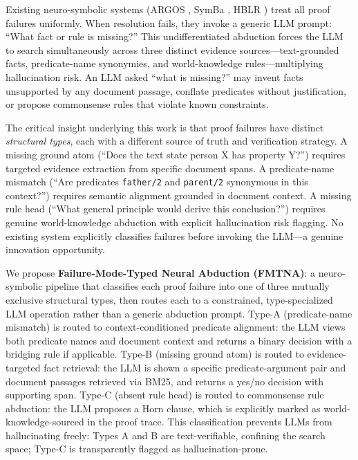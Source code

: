 \documentclass[11pt,letterpaper]{article}
\begin{document}
Existing neuro-symbolic systems (ARGOS \citep{Cotnareanu2026}, SymBa \citep{Lee2024}, HBLR \citep{Li2025}) treat all proof failures uniformly. When resolution fails, they invoke a generic LLM prompt: ``What fact or rule is missing?'' This undifferentiated abduction forces the LLM to search simultaneously across three distinct evidence sources---text-grounded facts, predicate-name synonymies, and world-knowledge rules---multiplying hallucination risk. An LLM asked ``what is missing?'' may invent facts unsupported by any document passage, conflate predicates without justification, or propose commonsense rules that violate known constraints.

The critical insight underlying this work is that proof failures have distinct \emph{structural types}, each with a different source of truth and verification strategy. A missing ground atom (``Does the text state person X has property Y?'') requires targeted evidence extraction from specific document spans. A predicate-name mismatch (``Are predicates \texttt{father/2} and \texttt{parent/2} synonymous in this context?'') requires semantic alignment grounded in document context. A missing rule head (``What general principle would derive this conclusion?'') requires genuine world-knowledge abduction with explicit hallucination risk flagging. No existing system explicitly classifies failures before invoking the LLM---a genuine innovation opportunity.

We propose \textbf{Failure-Mode-Typed Neural Abduction (FMTNA)}: a neuro-symbolic pipeline that classifies each proof failure into one of three mutually exclusive structural types, then routes each to a constrained, type-specialized LLM operation rather than a generic abduction prompt. Type-A (predicate-name mismatch) is routed to context-conditioned predicate alignment: the LLM views both predicate names and document context and returns a binary decision with a bridging rule if applicable. Type-B (missing ground atom) is routed to evidence-targeted fact retrieval: the LLM is shown a specific predicate-argument pair and document passages retrieved via BM25, and returns a yes/no decision with supporting span. Type-C (absent rule head) is routed to commonsense rule abduction: the LLM proposes a Horn clause, which is explicitly marked as world-knowledge-sourced in the proof trace. This classification prevents LLMs from hallucinating freely: Types A and B are text-verifiable, confining the search space; Type-C is transparently flagged as hallucination-prone.
\end{document}
